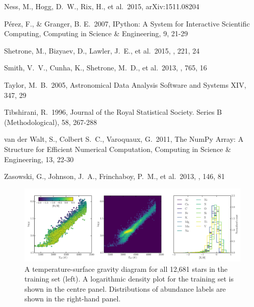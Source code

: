 \documentclass[12pt,preprint]{aastex}
\begin{document}
\begin{thebibliography}{dummy}
 Ness, M., Hogg, D.~W., 
Rix, H., et al.\ 2015, arXiv:1511.08204 

 P\'erez, F., \& Granger, B. E.\ 2007, IPython: A System for Interactive Scientific Computing, Computing in Science \& Engineering, 9, 21-29

 Shetrone, M., Bizyaev, 
D., Lawler, J.~E., et al.\ 2015, \apjs, 221, 24 

 Smith, V.~V., Cunha, K., 
Shetrone, M.~D., et al.\ 2013, \apj, 765, 16 

 Taylor, M.~B.\ 2005, Astronomical Data Analysis Software and Systems XIV, 347, 29 

 Tibshirani, R.\ 1996, Journal of the Royal Statistical Society. Series B (Methodological), 58, 267-288

 van der Walt, S., Colbert S.~C., Varoquaux, G.\ 2011, The NumPy Array: A Structure for Efficient Numerical Computation, Computing in Science \& Engineering, 13, 22-30

 Zasowski, G., Johnson, 
J.~A., Frinchaboy, P.~M., et al.\ 2013, \aj, 146, 81 


\end{thebibliography}

\clearpage

\begin{figure}[p]
\centering
\includegraphics[width=\textwidth]{training_set_hrd.pdf}
\caption{A temperature-surface gravity diagram for all 12,681 stars in
the training set (left). A logarithmic density plot for the training set
is shown in the centre panel. Distributions of abundance labels
are shown in the right-hand panel.\label{fig:training_set_hrd}}
\end{figure}

\clearpage
\end{document}
